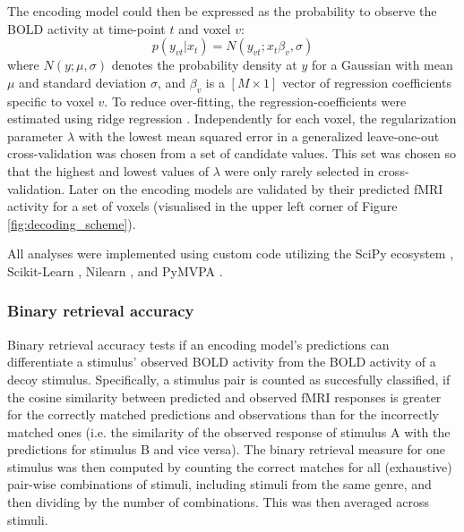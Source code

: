 The encoding model could then be expressed as the probability to observe the
BOLD activity at time-point $t$ and voxel $v$:
\begin{equation}
  \label{eq:encmo}
  p(y_{vt}|x_{t}) = N(y_{vt};x_{t}\beta_{v},\sigma)
\end{equation}
where $N(y;\mu,\sigma)$ denotes the probability density at $y$ for a
Gaussian with mean $\mu$ and standard deviation $\sigma$, and $\beta_{v}$ is a
$[M\times1]$ vector of regression coefficients specific to voxel $v$. To reduce
over-fitting, the regression-coefficients were estimated using ridge regression
\citep{HK70}.  Independently for each voxel, the regularization parameter
$\lambda$ with the lowest mean squared error in a generalized leave-one-out
cross-validation \citep{GHW79} was chosen from a set of candidate values.
This set was chosen so that the highest and lowest values of $\lambda$ were only
rarely selected in cross-validation.
Later on the encoding models are validated by their predicted f{MRI} activity
for a set of voxels (visualised in the upper left corner of Figure
\ref{fig:decoding_scheme}). 

All analyses were implemented using custom code utilizing the SciPy ecosystem \citep{jones2014scipy},
Scikit-Learn \citep{PVG+11}, Nilearn \citep{abraham2014machine}, and PyMVPA
\citep{HHS09b}.

%
%
\subsubsection*{Binary retrieval accuracy}
%
Binary retrieval accuracy \citep{ML08} tests if an encoding model's predictions
can differentiate a stimulus' observed BOLD activity from the BOLD activity of
a decoy stimulus.  Specifically, a stimulus pair is counted as succesfully
classified, if the cosine similarity between predicted and observed f{MRI}
responses is greater for the correctly matched predictions and observations
than for the incorrectly matched ones (i.e. the similarity of the observed
response of stimulus A with the predictions for stimulus B and vice versa).
The binary retrieval measure for one stimulus was then computed by counting the
correct matches for all (exhaustive) pair-wise combinations of stimuli, including
stimuli from the same genre, and then dividing by the number of combinations.
This was then averaged across stimuli.


